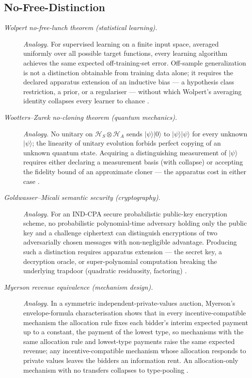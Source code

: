\subsection*{ No-Free-Distinction}
\begingroup\small
\begin{description}
\item[\emph{Wolpert no-free-lunch theorem (statistical learning).}] \textit{Analogy.}
For supervised learning on a finite input space, averaged uniformly
over all possible target functions, every learning algorithm
achieves the same expected off-training-set error.  Off-sample
generalization is not a distinction obtainable from training data
alone; it requires the declared apparatus extension of an
inductive bias --- a hypothesis class restriction, a prior, or a
regulariser --- without which Wolpert's averaging identity collapses
every learner to chance
\citep{Wolpert1996NoFreeLunch}.

\item[\emph{Wootters--Zurek no-cloning theorem (quantum mechanics).}] \textit{Analogy.}
No unitary on \(\mathcal H_S\otimes\mathcal H_A\) sends
\(|\psi\rangle|0\rangle\) to \(|\psi\rangle|\psi\rangle\) for every
unknown \(|\psi\rangle\); the linearity of unitary evolution
forbids perfect copying of an unknown quantum state.  Acquiring a
distinguishing measurement of \(|\psi\rangle\) requires either
declaring a measurement basis (with collapse) or accepting the
fidelity bound of an approximate cloner --- the  apparatus
cost in either case
\citep{WoottersZurek1982NoCloning}.

\item[\emph{Goldwasser--Micali semantic security (cryptography).}] \textit{Analogy.}
For an IND-CPA secure probabilistic public-key encryption scheme,
no probabilistic polynomial-time adversary holding only the public
key and a challenge ciphertext can distinguish encryptions of two
adversarially chosen messages with non-negligible advantage.
Producing such a distinction requires apparatus extension --- the
secret key, a decryption oracle, or super-polynomial computation
breaking the underlying trapdoor (quadratic residuosity, factoring)
\citep{GoldwasserMicali1984ProbabilisticEncryption}.

\item[\emph{Myerson revenue equivalence (mechanism design).}] \textit{Analogy.}
In a symmetric independent-private-values auction, Myerson's envelope-formula characterisation shows that in every
incentive-compatible mechanism the allocation rule fixes each
bidder's interim expected payment up to a constant, the payment of
the lowest type, so mechanisms with the same allocation rule and
lowest-type payments raise the same expected revenue; any
incentive-compatible mechanism whose allocation responds to private
values leaves the bidders an information rent.  An allocation-only mechanism with no transfers collapses
to type-pooling
\citep{Myerson1981OptimalAuctionDesign}.
\end{description}
\endgroup

